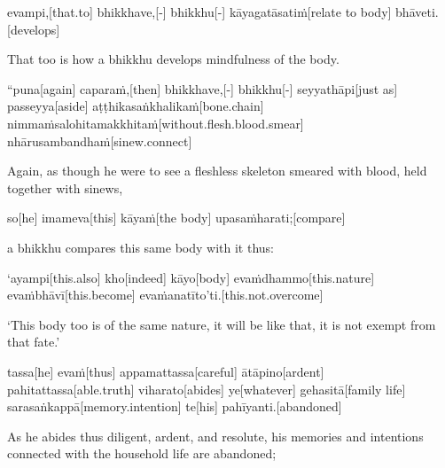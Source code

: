 \begin{samepage}
\begingl[glneveryline={\PaliGlossA,\PaliGlossB}]
evampi,[that.to] bhikkhave,[-] bhikkhu[-] kāyagatāsatiṁ[relate to body] bhāveti.[develops]
\endgl
\nopagebreak
\linespread{0.5}
\begin{spacin}{0.2}
{\PaliGlossFT That too is how a bhikkhu develops mindfulness of the body.}
\end{spacin}
\vskip 12pt
\end{samepage}
\vskip 0.2in
\begin{samepage}
\begingl[glneveryline={\PaliGlossA,\PaliGlossB}]
“puna[again] caparaṁ,[then] bhikkhave,[-] bhikkhu[-] seyyathāpi[just as] passeyya[aside] aṭṭhikasaṅkhalikaṁ[bone.chain] nimmaṁsalohitamakkhitaṁ[without.flesh.blood.smear] nhārusambandhaṁ[sinew.connect]
\endgl
\nopagebreak
\linespread{0.5}
\begin{spacin}{0.2}
{\PaliGlossFT Again, as though he were to see a fleshless skeleton smeared with blood, held together with sinews,}
\end{spacin}
\vskip 12pt
\end{samepage}
\begin{samepage}
\begingl[glneveryline={\PaliGlossA,\PaliGlossB}]
so[he] imameva[this] kāyaṁ[the body] upasaṁharati;[compare]
\endgl
\nopagebreak
\linespread{0.5}
\begin{spacin}{0.2}
{\PaliGlossFT a bhikkhu compares this same body with it thus:}
\end{spacin}
\vskip 12pt
\end{samepage}
\begin{samepage}
\begingl[glneveryline={\PaliGlossA,\PaliGlossB}]
‘ayampi[this.also] kho[indeed] kāyo[body] evaṁdhammo[this.nature] evaṁbhāvī[this.become] evaṁanatīto’ti.[this.not.overcome]
\endgl
\nopagebreak
\linespread{0.5}
\begin{spacin}{0.2}
{\PaliGlossFT ‘This body too is of the same nature, it will be like that, it is not exempt from that fate.’}
\end{spacin}
\vskip 12pt
\end{samepage}
\begin{samepage}
\begingl[glneveryline={\PaliGlossA,\PaliGlossB}]
tassa[he] evaṁ[thus] appamattassa[careful] ātāpino[ardent] pahitattassa[able.truth] viharato[abides] ye[whatever] gehasitā[family life] sarasaṅkappā[memory.intention] te[his] pahīyanti.[abandoned]
\endgl
\nopagebreak
\linespread{0.5}
\begin{spacin}{0.2}
{\PaliGlossFT As he abides thus diligent, ardent, and resolute, his memories and intentions connected with the household life are abandoned;}
\end{spacin}
\vskip 12pt
\end{samepage}
